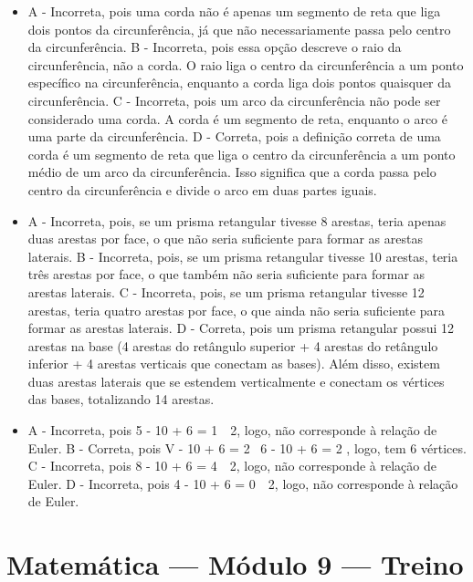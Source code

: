 \begin{itemize}
\item A - Incorreta, pois uma corda não é apenas um segmento de reta que liga
dois pontos da circunferência, já que não necessariamente passa pelo
centro da circunferência.
B - Incorreta, pois essa opção descreve o raio da circunferência, não a
corda. O raio liga o centro da circunferência a um ponto específico na
circunferência, enquanto a corda liga dois pontos quaisquer da
circunferência.
C - Incorreta, pois um arco da circunferência não pode ser considerado
uma corda. A corda é um segmento de reta, enquanto o arco é uma parte da
circunferência.
D - Correta, pois a definição correta de uma corda é um segmento de reta
que liga o centro da circunferência a um ponto médio de um arco da
circunferência. Isso significa que a corda passa pelo centro da
circunferência e divide o arco em duas partes iguais.
\item A - Incorreta, pois, se um prisma retangular tivesse 8 arestas, teria
apenas duas arestas por face, o que não seria suficiente para formar as
arestas laterais.
B - Incorreta, pois, se um prisma retangular tivesse 10 arestas, teria
três arestas por face, o que também não seria suficiente para formar as
arestas laterais.
C - Incorreta, pois, se um prisma retangular tivesse 12 arestas, teria
quatro arestas por face, o que ainda não seria suficiente para formar as
arestas laterais.
D - Correta, pois um prisma retangular possui 12 arestas na base (4
arestas do retângulo superior + 4 arestas do retângulo inferior + 4
arestas verticais que conectam as bases). Além disso, existem duas
arestas laterais que se estendem verticalmente e conectam os vértices
das bases, totalizando 14 arestas.
\item A - Incorreta, pois 5 - 10 + 6 = 1\  \neq \ 2, logo, não corresponde
à relação de Euler.
B - Correta, pois V - 10 + 6 = 2 \rightarrow \ 6 - 10 + 6 = 2 ,
logo, tem 6 vértices.
C - Incorreta, pois 8 - 10 + 6 = 4\  \neq \ 2, logo, não corresponde
à relação de Euler.
D - Incorreta, pois 4 - 10 + 6 = 0\  \neq \ 2, logo, não corresponde
à relação de Euler.
\end{itemize}

\section*{Matemática — Módulo 9 — Treino}

